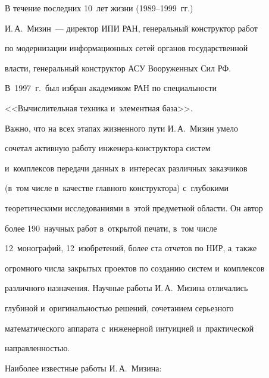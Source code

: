      В течение последних 10~лет жизни (1989--1999~гг.)\


И.\,А.~Мизин~--- директор ИПИ РАН, генеральный конструктор работ


по модернизации информационных сетей органов государственной


власти, генеральный конструктор АСУ Вооруженных Сил РФ.


В~1997~г.\ был избран академиком РАН по специальности


<<Вы\-чис\-ли\-тель\-ная техника и~элементная база>>.





     Важно, что на всех этапах жизненного пути И.\,А.~Мизин умело


сочетал активную работу ин\-же\-не\-ра-кон\-ст\-рук\-то\-ра систем


и~комплексов передачи данных в~интересах различных заказчиков


(в~том числе в~качестве главного конструктора) с~глубокими


теоретическими исследованиями в~этой предметной области. Он автор


более 190~научных работ в~открытой печати, в~том числе


12~монографий, 12~изобретений, более ста отчетов по НИР, а~также


огромного числа закрытых проектов по созданию систем и~комплексов


различного назначения. Научные работы И.\,А.~Мизина отличались


глубиной и~оригинальностью решений, сочетанием серьезного


математического аппарата с~инженерной интуицией и~практической


направленностью.





     Наиболее известные работы И.\,А.~Мизина:


